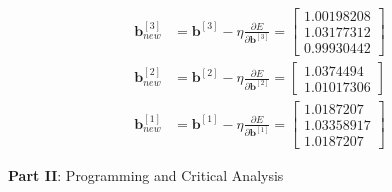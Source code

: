 \documentclass[12pt]{article}
\begin{document}
\begin{enumerate}[leftmargin=\labelsep]
    \begin{equation}
    \begin{aligned}
        \mathbf{b}_{new}^{[3]} &= \mathbf{b}^{[3]} - \eta \frac{\partial E}{\partial \mathbf{b}^{[3]}}
        = \begin{bmatrix}
            1.00198208 \\ 1.03177312 \\ 0.99930442
            \end{bmatrix} \\
        \mathbf{b}_{new}^{[2]} &= \mathbf{b}^{[2]} - \eta \frac{\partial E}{\partial \mathbf{b}^{[2]}}
        = \begin{bmatrix}
            1.0374494 \\ 1.01017306
        \end{bmatrix} \\
        \mathbf{b}_{new}^{[1]} &= \mathbf{b}^{[1]} - \eta \frac{\partial E}{\partial \mathbf{b}^{[1]}}
        = \begin{bmatrix}
            1.0187207 \\ 1.03358917 \\ 1.0187207 
            \end{bmatrix}
    \end{aligned}
    \end{equation}

\end{enumerate}

\vskip 1cm

\large{\textbf{Part II}: Programming and Critical Analysis}\normalsize
\end{document}
